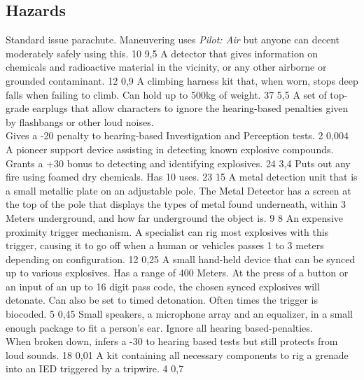 \pagebreak %
\subsection{Hazards}
\vspace{10mm}
\begin{multicols}{2}
    {Standard issue parachute.
        Maneuvering uses \emph{Pilot: Air}
        but anyone can decent moderately safely using this.}
    {10}
    {9,5}
    {A detector that gives information on chemicals and radioactive material in the vicinity,
	or any other airborne or grounded contaminant.
	}{12}
    {0,9}
    {A climbing harness kit that, when worn, stops deep falls when failing to climb.
        Can hold up to 500kg of weight.}
    {37}
    {5,5}
    {A set of top-grade earplugs that allow characters
        to ignore the hearing-based penalties given by flashbangs or other loud noises.\\
        Gives a -20 penalty to hearing-based Investigation and Perception tests.}
    {2}
    {0,004}
    {A pioneer support device assisting in detecting known explosive compounds.
        Grants a +30 bonus to detecting and identifying explosives.}
    {24}
    {3,4}
    {Puts out any fire using foamed dry chemicals. Has 10 uses.}
    {23}
    {15}
    {A metal detection unit that is a small metallic plate on an adjustable pole.
        The Metal Detector has a screen at the top of the pole
        that displays the types of metal found underneath,
        within 3 Meters underground,
        and how far underground the object is.}
    {9}
    {8}
    {An expensive proximity trigger mechanism.
        A specialist can rig most explosives with this trigger,
        causing it to go off when a human or vehicles passes
        1 to 3 meters depending on configuration.}
    {12}
    {0,25}
    {A small hand-held device that can be synced up to various explosives.
        Has a range of 400 Meters.
        At the press of a button or an input of an up to 16 digit pass code,
        the chosen synced explosives will detonate.
        Can also be set to timed detonation.
        Often times the trigger is biocoded.}
    {5}
    {0,45}
    {Small speakers, a microphone array and an equalizer,
        in a small enough package to fit a person's ear.
        Ignore all hearing based-penalties.\\
        When broken down, infers a -30 to hearing based tests
        but still protects from loud sounds.}
    {18}
    {0,01}
    {A kit containing all necessary components to rig a grenade
        into an IED triggered by a tripwire.}
    {4}
    {0,7}
\end{multicols}

